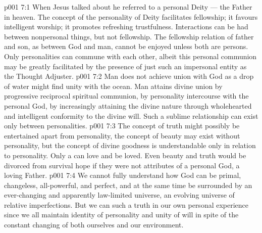 \vs p001 7:1 When Jesus talked about  he referred to a personal Deity --- the Father in heaven. The concept of the personality of Deity facilitates fellowship; it favours intelligent worship; it promotes refreshing trustfulness. Interactions can be had between nonpersonal things, but not fellowship. The fellowship relation of father and son, as between God and man, cannot be enjoyed unless both are persons. Only personalities can commune with each other, albeit this personal communion may be greatly facilitated by the presence of just such an impersonal entity as the Thought Adjuster.
\vs p001 7:2 Man does not achieve union with God as a drop of water might find unity with the ocean. Man attains divine union by progressive reciprocal spiritual communion, by personality intercourse with the personal God, by increasingly attaining the divine nature through wholehearted and intelligent conformity to the divine will. Such a sublime relationship can exist only between personalities.
\vs p001 7:3 \pc The concept of truth might possibly be entertained apart from personality, the concept of beauty may exist without personality, but the concept of divine goodness is understandable only in relation to personality. Only a  can love and be loved. Even beauty and truth would be divorced from survival hope if they were not attributes of a personal God, a loving Father.
\vs p001 7:4 \pc We cannot fully understand how God can be primal, changeless, all\hyp{}powerful, and perfect, and at the same time be surrounded by an ever\hyp{}changing and apparently law\hyp{}limited universe, an evolving universe of relative imperfections. But we can  such a truth in our own personal experience since we all maintain identity of personality and unity of will in spite of the constant changing of both ourselves and our environment.
